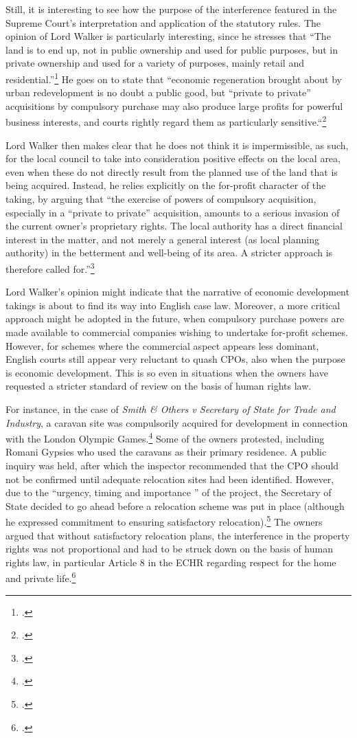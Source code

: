 \documentclass[12pt,a4paper]{book} %
\begin{document}
Still, it is interesting to see how the purpose of the interference featured in the Supreme Court's interpretation and application of the statutory rules. The opinion of Lord Walker is particularly interesting, since he stresses that ``The land is to end up, not in public ownership and used for public purposes, but in private ownership and used for a variety of purposes, mainly retail and residential.''\footcite[81]{sainsbury10} He goes on to state that ``economic regeneration brought about by urban redevelopment is no doubt a public good, but ``private to private'' acquisitions by compulsory purchase may also produce large profits for powerful business interests, and courts rightly regard them as particularly sensitive.``\footcite[81]{sainsbury10}

Lord Walker then makes clear that he does not think it is impermissible, as such, for the local council to take into consideration positive effects on the local area, even when these do not directly result from the planned use of the land that is being acquired. Instead, he relies explicitly on the for-profit character of the taking, by arguing that ``the exercise of powers of compulsory acquisition, especially in a ``private to private'' acquisition, amounts to a serious invasion of the current owner's proprietary rights. The local authority has a direct financial interest in the matter, and not merely a general interest (as local planning authority) in the betterment and well-being of its area. A stricter approach is therefore called for.''\footcite[84]{sainsbury10} 

Lord Walker's opinion might indicate that the narrative of economic development takings is about to find its way into English case law. Moreover, a more critical approach might be adopted in the future, when compulsory purchase powers are made available to commercial companies wishing to undertake for-profit schemes. However, for schemes where the commercial aspect appears less dominant, English courts still appear very reluctant to quash CPOs, also when the purpose is economic development. This is so even in situations when the owners have requested a stricter standard of review on the basis of human rights law. 

For instance, in the case of {\it Smith \& Others v Secretary of State for Trade and Industry}, a caravan site was compulsorily acquired for development in connection with the London Olympic Games.\footcite{smith08} Some of the owners protested, including Romani Gypsies who used the caravans as their primary residence. A public inquiry was held, after which the inspector recommended that the CPO should not be confirmed until adequate relocation sites had been identified. However, due to the ``urgency, timing and importance '' of the project, the Secretary of State decided to go ahead before a relocation scheme was put in place (although he expressed commitment to ensuring satisfactory relocation).\footcite[10]{smith08} The owners argued that without satisfactory relocation plans, the interference in the property rights was not proportional and had to be struck down on the basis of human rights law, in particular Article 8 in the ECHR regarding respect for the home and private life.\footcite[27-51]{smith08}
\end{document}
